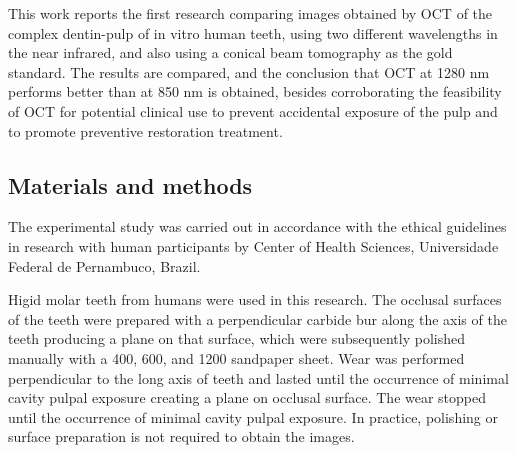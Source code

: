 \documentclass[12pt,twoside,english]{book}
\renewcommand{\~}{\perispomeni}%
\numberwithin{equation}{section}
\numberwithin{figure}{section}
\begin{document}

This work reports the first research comparing images obtained by OCT of the complex dentin-pulp of in vitro human teeth, using two different wavelengths in the near infrared, and also using a conical beam tomography as the gold standard. The results are compared, and the conclusion that OCT at 1280 nm performs better than at 850 nm is obtained, besides corroborating the feasibility of OCT for potential clinical use to prevent accidental exposure of the pulp and to promote preventive restoration treatment.


\subsection{Materials and methods}

The experimental study was carried out in accordance with the ethical guidelines in research with human participants by Center of Health Sciences, Universidade Federal de Pernambuco, Brazil. 

Higid molar teeth from humans were used in this research. The occlusal surfaces of the teeth were prepared with a perpendicular carbide bur along the axis of the teeth producing a plane on that surface, which were subsequently polished manually with a 400, 600, and 1200 sandpaper sheet. Wear was performed perpendicular to the long axis of teeth and lasted until the occurrence of minimal cavity pulpal exposure creating a plane on occlusal surface. The wear stopped until the occurrence of minimal cavity pulpal exposure. In practice, polishing or surface preparation is not required to obtain the images. 
\end{document}
